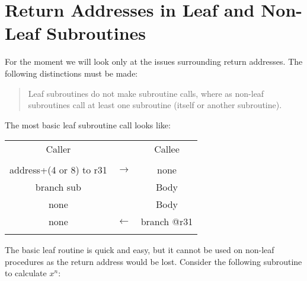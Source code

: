 \section{Return Addresses in Leaf and Non-Leaf Subroutines}

For the moment we will look only at the issues surrounding return addresses.  The following distinctions must be made:
\begin{quote}
Leaf subroutines do not make subroutine calls, where as non-leaf subroutines call at least one subroutine (itself or another subroutine).
\end{quote}


The most basic leaf subroutine call looks like:

\begin{tabular}{|c|c|c|}
  \multicolumn{1}{c}{Caller} & \multicolumn{1}{c}{ } & \multicolumn{1}{c}{Callee} \\
  & & \\
  \cline{1-1} \cline{3-3}
  address+(4 or 8) to r31  & $\rightarrow$ & none \\ \cline{3-3}
  branch sub     &   & Body \\ \cline{1-1}
  none           &   & Body \\ \cline{3-3}
  none           & $\leftarrow$ & branch @r31 \\ \cline{1-1} \cline{3-3}
  & & \\
\end{tabular}

The basic leaf routine is quick and easy, but it cannot be used on non-leaf procedures as the return address would be lost.  Consider the following subroutine to calculate $x^n$:

